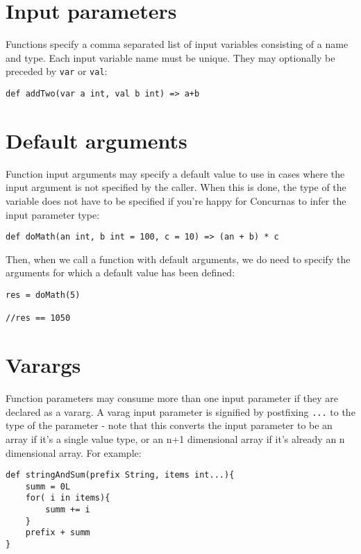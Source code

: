 \documentclass[conc-doc]{subfiles}
\begin{document}
\section{Input parameters}
Functions specify a comma separated list of input variables consisting of a name and type. Each input variable name must be unique. They may optionally be preceded by \lstinline{var} or \lstinline{val}:

\begin{lstlisting}
def addTwo(var a int, val b int) => a+b

\end{lstlisting}

\section{Default arguments}
Function input arguments may specify a default value to use in cases where the input argument is not specified by the caller. When this is done, the type of the variable does not have to be specified if you're happy for Concurnas to infer the input parameter type:

\begin{lstlisting}
def doMath(an int, b int = 100, c = 10) => (an + b) * c

\end{lstlisting}

Then, when we call a function with default arguments, we do need to specify the arguments for which a default value has been defined:

\begin{lstlisting}
res = doMath(5)

//res == 1050
\end{lstlisting}

\section{Varargs}
Function parameters may consume more than one input parameter if they are declared as a vararg. A varag input parameter is signified by postfixing \lstinline{...} to the type of the parameter - note that this converts the input parameter to be an array if it's a single value type, or an n+1 dimensional array if it's already an n dimensional array. For example:

\begin{lstlisting}
def stringAndSum(prefix String, items int...){
	summ = 0L
	for( i in items){
		summ += i
	}
	prefix + summ
}

\end{lstlisting}
\end{document}
